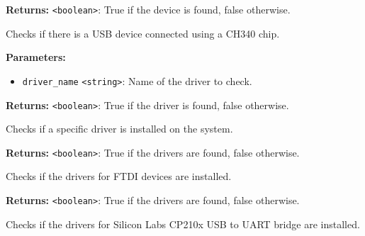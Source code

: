 \documentclass[12pt,a4paper]{article}
\begin{document}
\vspace{5mm}
\noindent {}


\noindent \textbf{Returns:} \texttt{<boolean>}: True if the device is found, false otherwise.

\noindent Checks if there is a USB device connected using a CH340 chip.

\vspace{5mm}
\noindent {}


\noindent \textbf{Parameters:}
\begin{itemize}
  \item \texttt{driver\_name} \texttt{<string>}: Name of the driver to check.
\end{itemize}

\noindent \textbf{Returns:} \texttt{<boolean>}: True if the driver is found, false otherwise.

\noindent Checks if a specific driver is installed on the system.

\vspace{5mm}
\noindent {}


\noindent \textbf{Returns:} \texttt{<boolean>}: True if the drivers are found, false otherwise.

\noindent Checks if the drivers for FTDI devices are installed.

\vspace{5mm}
\noindent {}


\noindent \textbf{Returns:} \texttt{<boolean>}: True if the drivers are found, false otherwise.

\noindent Checks if the drivers for Silicon Labs CP210x USB to UART bridge are installed.

\vspace{5mm}
\noindent {}
\end{document}
